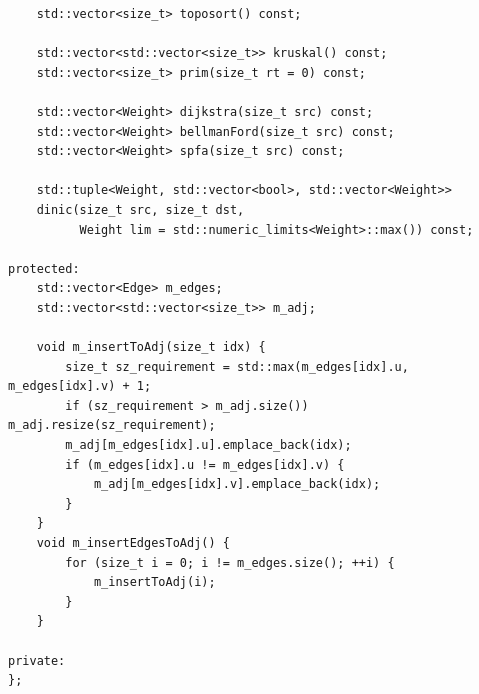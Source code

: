 \documentclass[UTF8]{article}
\begin{document}
\begin{verbatim}
	std::vector<size_t> toposort() const;

	std::vector<std::vector<size_t>> kruskal() const;
	std::vector<size_t> prim(size_t rt = 0) const;

	std::vector<Weight> dijkstra(size_t src) const;
	std::vector<Weight> bellmanFord(size_t src) const;
	std::vector<Weight> spfa(size_t src) const;

	std::tuple<Weight, std::vector<bool>, std::vector<Weight>>
	dinic(size_t src, size_t dst,
		  Weight lim = std::numeric_limits<Weight>::max()) const;

protected:
	std::vector<Edge> m_edges;
	std::vector<std::vector<size_t>> m_adj;

	void m_insertToAdj(size_t idx) {
		size_t sz_requirement = std::max(m_edges[idx].u, m_edges[idx].v) + 1;
		if (sz_requirement > m_adj.size()) m_adj.resize(sz_requirement);
		m_adj[m_edges[idx].u].emplace_back(idx);
		if (m_edges[idx].u != m_edges[idx].v) {
			m_adj[m_edges[idx].v].emplace_back(idx);
		}
	}
	void m_insertEdgesToAdj() {
		for (size_t i = 0; i != m_edges.size(); ++i) {
			m_insertToAdj(i);
		}
	}

private:
};
\end{verbatim}
\end{document}
